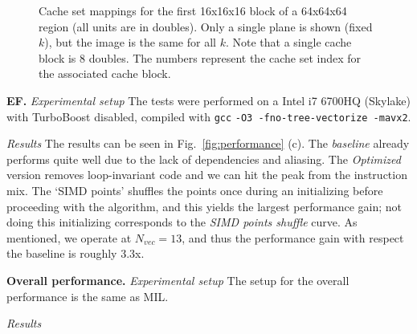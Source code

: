\documentclass[letterpaper]{article}
\newcommand{\mypar}[1]{{\bf #1.}}
\newcommand\inputpgf[2]{{
\let\pgfimageWithoutPath\pgfimage
\renewcommand{\pgfimage}[2][]{\pgfimageWithoutPath[##1]{#1/##2}}

}}
\begin{document}
\begin{figure}[H]
  \centering
  \scalebox{0.9}{%
  }
  \caption{Cache set mappings for the first 16x16x16 block of a 64x64x64 region (all units are in doubles). Only a single plane is shown (fixed $k$), but the image is the same for all $k$. Note that a single cache block is 8 doubles. The numbers represent the cache set index for the associated cache block.}
  \label{res:conflict_miss_64}
\end{figure}

\mypar{EF} \textit{Experimental setup} The tests were performed on a Intel i7 6700HQ (Skylake) with TurboBoost disabled, compiled with \texttt{gcc} \texttt{-O3 -fno-tree-vectorize -mavx2}.

\textit{Results}
 The results can be seen in Fig.~\ref{fig:performance} (c). The \textit{baseline} already performs quite well due to the lack of dependencies and aliasing. The \textit{Optimized} version removes loop-invariant code and we can hit the peak from the instruction mix. The `SIMD points' shuffles the points once during an initializing before proceeding with the algorithm, and this yields the largest performance gain; not doing this initializing corresponds to the \textit{SIMD points shuffle} curve. As mentioned, we operate at $N_{vec}=13$, and thus the performance gain with respect the baseline is roughly 3.3x. 


\mypar{Overall performance} \textit{Experimental setup} The setup for the overall performance is the same as MIL.

\textit{Results}
\end{document}
